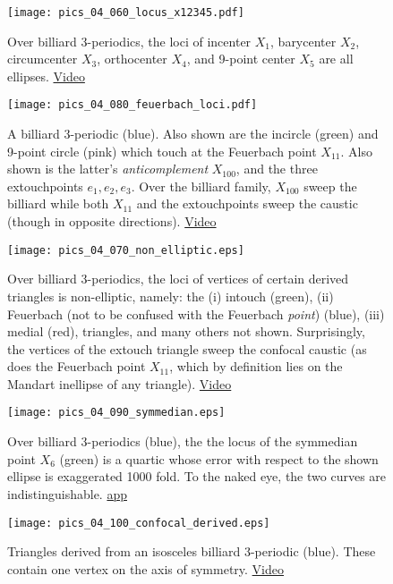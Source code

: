 \begin{figure}
\centering
\texttt{[image: pics\_04\_060\_locus\_x12345.pdf]}
\caption{Over billiard 3-periodics, the loci of incenter $X_1$, barycenter $X_2$, circumcenter $X_3$, orthocenter $X_4$, and 9-point center $X_5$ are all ellipses. \href{https://youtu.be/sMcNzcYaqtg}{Video}}
\label{fig:04-x12345}
\end{figure}

\begin{figure}
    \centering
    \texttt{[image: pics\_04\_080\_feuerbach\_loci.pdf]}
    \caption{A billiard 3-periodic (blue). Also shown are the incircle (green) and 9-point circle (pink) which touch at the Feuerbach point $X_{11}$. Also shown is the latter's {\em anticomplement} $X_{100}$, and the three extouchpoints $e_1,e_2,e_3$. Over the billiard family, $X_{100}$ sweep the billiard while both $X_{11}$ and the extouchpoints sweep the caustic (though in opposite directions).
    \href{https://youtu.be/TXdg7tUl8lc}{Video}}
    \label{fig:04-feuer-loci}
\end{figure}


\begin{figure}
    \centering
    \texttt{[image: pics\_04\_070\_non\_elliptic.eps]}
    \caption{Over billiard 3-periodics, the loci of vertices of certain derived triangles is non-elliptic, namely: the (i) intouch (green), (ii) Feuerbach (not to be confused with the Feuerbach {\em point}) (blue), (iii) medial (red), triangles, and many others not shown. Surprisingly, the vertices of the extouch triangle sweep the confocal caustic (as does the Feuerbach point $X_{11}$, which by definition lies on the Mandart inellipse of any triangle).
     \href{https://youtu.be/OGvCQbYqJyI}{Video}}
    \label{fig:04-non-elliptic}
\end{figure}

\begin{figure}
    \centering
    \texttt{[image: pics\_04\_090\_symmedian.eps]}
    \caption{Over billiard 3-periodics (blue), the the locus of the symmedian point $X_6$ (green) is a quartic whose error with respect to the shown ellipse is exaggerated 1000 fold. To the naked eye, the two curves are indistinguishable. \href{https://bit.ly/3qc0Z0L}{app}}
    \label{fig:symmedian}
\end{figure}


\begin{figure}
    \centering
    \texttt{[image: pics\_04\_100\_confocal\_derived.eps]}
    \caption{Triangles derived from an isosceles billiard 3-periodic (blue). These contain one vertex on the axis of symmetry. \href{https://youtu.be/xyroRTEVNDc}{Video}}
    \label{fig:04-derived-isosceles}
\end{figure}

